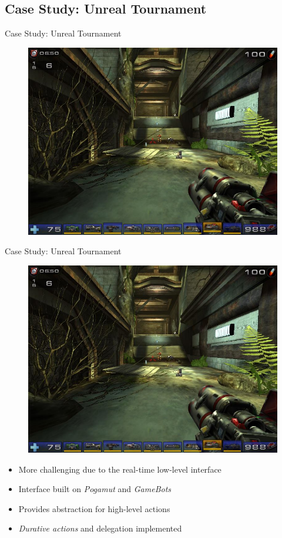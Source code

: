 \documentclass[t]{beamer}
\begin{document}
\subsection{Case Study: Unreal Tournament}
\begin{frame}{Case Study: Unreal Tournament}
	\begin{figure}
		\includegraphics[width=0.95\linewidth]{ut2004}
	\end{figure}
\end{frame}
\begin{frame}[noframenumbering]{Case Study: Unreal Tournament}
	\begin{figure}
		\includegraphics[width=0.6\linewidth]{ut2004}
	\end{figure}
	\begin{itemize}[<+->]
		\item More challenging due to the real-time low-level interface
		\item Interface built on \textit{Pogamut} and \textit{GameBots}
		\item Provides abstraction for high-level actions
		\item \textit{Durative actions} and delegation implemented
	\end{itemize}
\end{frame}
\end{document}
